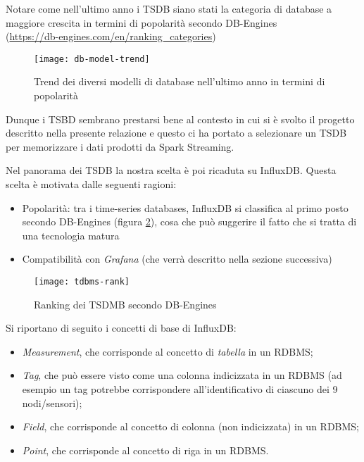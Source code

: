 Notare come nell'ultimo anno i TSDB siano stati la categoria di database a maggiore crescita in termini di popolarità secondo DB-Engines \\ (\url{https://db-engines.com/en/ranking_categories})

\begin{figure}[ht]
\centering
\texttt{[image: db-model-trend]}
\caption{Trend dei diversi modelli di database nell'ultimo anno in termini di popolarità}
\label{fig:db-model-trend}
\end{figure}

Dunque i TSBD sembrano prestarsi bene al contesto in cui si è svolto il progetto descritto nella presente relazione e questo ci ha portato a selezionare un TSDB per memorizzare i dati prodotti da Spark Streaming.\par

Nel panorama dei TSDB la nostra scelta è poi ricaduta su InfluxDB. Questa scelta è motivata dalle seguenti ragioni:

\begin{itemize}
    \item Popolarità: tra i time-series databases, InfluxDB si classifica al primo posto secondo DB-Engines (figura \ref{fig:tsdbms-rank}), cosa che può suggerire il fatto che si tratta di una tecnologia matura
    \item Compatibilità con \textit{Grafana} (che verrà descritto nella sezione successiva)
\end{itemize}

\begin{figure}[ht]
\centering
\texttt{[image: tdbms-rank]}
\caption{Ranking dei TSDMB secondo DB-Engines}
\label{fig:tsdbms-rank}
\end{figure}

Si riportano di seguito i concetti di base di InfluxDB:\par

\begin{itemize}
    \item \textit{Measurement}, che corrisponde al concetto di \textit{tabella} in un RDBMS;
    \item \textit{Tag}, che può essere visto come una colonna indicizzata in un RDBMS (ad esempio un tag potrebbe corrispondere all'identificativo di ciascuno dei 9 nodi/sensori);
    \item \textit{Field}, che corrisponde al concetto di colonna (non indicizzata) in un RDBMS;
    \item \textit{Point}, che corrisponde al concetto di riga in un RDBMS.
\end{itemize}{}


